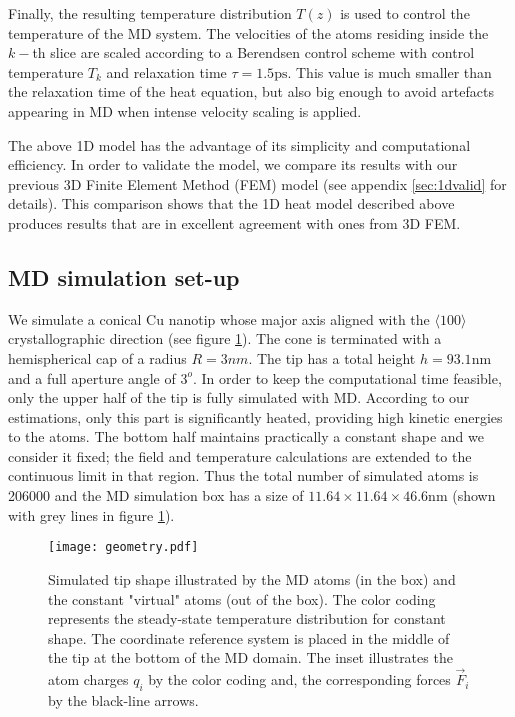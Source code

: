 \documentclass[%
 aps,
 prb,%
 amsmath,amssymb,
reprint,%
superscriptaddress,
]{revtex4-1}
\begin{document}
Finally, the resulting temperature distribution $T(z)$ is used to control the temperature of the MD system.
The velocities of the atoms residing inside the $k-$th slice are scaled according to a Berendsen control scheme \cite{Berendsen} with control temperature $T_k$ and relaxation time $\tau = 1.5\textrm{ps}$.
This value is much smaller than the relaxation time of the heat equation, but also big enough to avoid artefacts appearing in MD when intense velocity scaling is applied. 

The above 1D model has the advantage of its simplicity and computational efficiency.
In order to validate the model, we compare its results with our previous 3D Finite Element Method (FEM) model \cite{Eimre2015} (see appendix \ref{sec:1dvalid} for details). 
This comparison shows that the 1D heat model described above produces results that are in excellent agreement with ones from 3D FEM.


\subsection{MD simulation set-up} \label{ssec:setup}
We simulate a conical Cu nanotip whose major axis aligned with the $\langle 100 \rangle$ crystallographic direction (see figure \ref{fig:resheat}).
The cone is terminated with a hemispherical cap of a radius $R = 3nm$.
The tip has a total height $h = 93.1\textrm{nm}$ and a full aperture angle of $3^o$.
In order to keep the computational time feasible, only the upper half of the tip is fully simulated with MD.
According to our estimations, only this part is significantly heated, providing high kinetic energies to the atoms.
The bottom half maintains practically a constant shape and we consider it fixed; the field and temperature calculations are extended to the continuous limit in that region.
Thus the total number of simulated atoms is 206000 and the MD simulation box has a size of $11.64 \times 11.64  \times 46.6$nm (shown with grey lines in figure \ref{fig:resheat}).
\begin{figure}[htbp]
	\centering
    \texttt{[image: geometry.pdf]}
    \caption{Simulated tip shape illustrated by the MD atoms (in the box) and the constant "virtual" atoms (out of the box). The color coding represents the steady-state temperature distribution for constant shape. The coordinate reference system is placed in the middle of the tip at the bottom of the MD domain. The inset illustrates the atom charges $q_i$ by the color coding and, the corresponding forces $\vec{F}_i$ by the black-line arrows.}
    \label{fig:resheat}
\end{figure}
\end{document}
